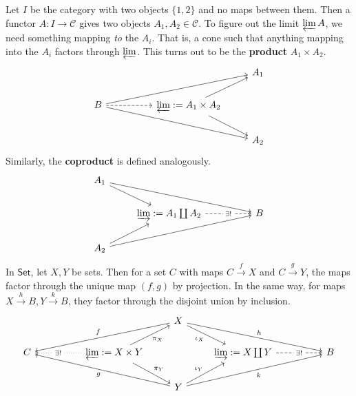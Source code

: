 \begin{example}
    Let $I$ be the category with two objects $\{1,2\} $ and no maps between them. Then a functor $A \colon I \to \mathcal{C} $ gives two objects $A_1,A_2 \in \mathcal{C} $. To figure out the limit $\varprojlim A$, we need something mapping  \emph{to} the $A_i $. That is, a cone such that anything mapping into the $A_i $ factors through $\varprojlim$. This turns out to be the  \textbf{product} $A_1\times A_2$. \[
    \begin{tikzcd}
                                               &  &                                                    & A_1 \\
B \arrow[rrrd] \arrow[rrru] \arrow[rr, dashed] &  & \varprojlim :=A_1 \times A_2 \arrow[ru] \arrow[rd] &     \\
                                               &  &                                                    & A_2
\end{tikzcd}
    \] Similarly, the \textbf{coproduct} is defined analogously. \[
    \begin{tikzcd}
A_1 \arrow[rd] \arrow[rrrd] &                                                                        &  &   \\
                            & \varinjlim:=A_1\coprod A_2 \arrow[rr, "\exists !" description, dashed] &  & B \\
A_2 \arrow[ru] \arrow[rrru] &                                                                        &  &  
\end{tikzcd}
    \]In $\mathsf{Set} $, let $X,Y$ be sets. Then for a set $C$ with maps $C\xrightarrow{f} X$ and $C\xrightarrow{g} Y$, the maps factor through the unique map $(f,g)$ by projection. In the same way, for maps $X\xrightarrow{h} B,Y\xrightarrow{k} B$, they factor through the disjoint union by inclusion. \[
    \begin{tikzcd}
  &  &                                                                                                              & X \arrow[rd, "\iota_X"'] \arrow[rrrd, "h"] \arrow[llld, "f"'] &                                                                    &  &   \\
C &  & \varprojlim:=X \times Y \arrow[ru, "\pi_X"'] \arrow[rd, "\pi_Y"] \arrow[ll, "\exists !" description, dotted] &                                                               & \varinjlim:=X\coprod Y \arrow[rr, "\exists !" description, dashed] &  & B \\
  &  &                                                                                                              & Y \arrow[ru, "\iota_Y"] \arrow[rrru, "k"'] \arrow[lllu, "g"]  &                                                                    &  &  
\end{tikzcd}
    \] 
\end{example}

